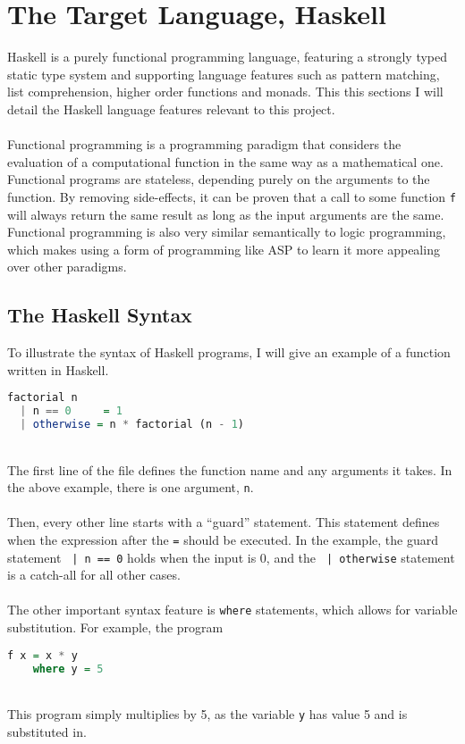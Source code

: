 \section{The Target Language, Haskell}
Haskell is a purely functional programming language, featuring a strongly typed static type system and supporting language features such as pattern matching, list comprehension, higher order functions and monads. This this sections I will detail the Haskell language features relevant to this project. \\ \\
Functional programming is a programming paradigm that considers the evaluation of a computational function in the same way as a mathematical one. Functional programs are stateless, depending purely on the arguments to the function. By removing side-effects, it can be proven that a call to some function \lstinline!f! will always return the same result as long as the input arguments are the same. Functional programming is also very similar semantically to logic programming, which makes using a form of programming like ASP to learn it more appealing over other paradigms.

\subsection{The Haskell Syntax}
To illustrate the syntax of Haskell programs, I will give an example of a function written in Haskell.

\begin{lstlisting}[language = Haskell]
factorial n
  | n == 0     = 1
  | otherwise = n * factorial (n - 1)
\end{lstlisting}
\mbox{} \\
The first line of the file defines the function name and any arguments it takes. In the above example, there is one argument, \lstinline!n!. \\ \\
Then, every other line starts with a ``guard'' statement. This statement defines when the expression after the \lstinline!=! should be executed. In the example, the guard statement \lstinline! | n == 0! holds when the input is 0, and the \lstinline! | otherwise! statement is a catch-all for all other cases. \\ \\
The other important syntax feature is \lstinline!where! statements, which allows for variable substitution. For example, the program \\

\begin{lstlisting}[language = Haskell]
f x = x * y
	where y = 5
\end{lstlisting}
\mbox{}\\
This program simply multiplies by 5, as the variable \lstinline!y! has value 5 and is substituted in.

%
%

\pagebreak
